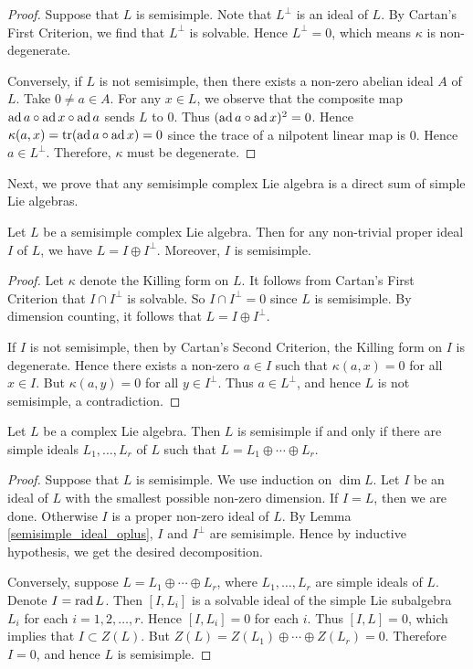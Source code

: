 \begin{proof}
    Suppose that $L$ is semisimple. Note that $L^\perp$ is an ideal of $L$. By Cartan's First Criterion, we find that $L^\perp$ is solvable. Hence $L^\perp=0$, which means $\kappa$ is non-degenerate.

    Conversely, if $L$ is not semisimple, then there exists a non-zero abelian ideal $A$ of $L$. Take $0\neq a\in A$. For any $x\in L$, we observe that the composite map $\operatorname{ad} a\circ \operatorname{ad} x \circ \operatorname{ad} a$ sends $L$ to 0. Thus $(\operatorname{ad} a \circ \operatorname{ad} x)^2=0$. Hence $\kappa(a,x)=\operatorname{tr}(\operatorname{ad} a \circ \operatorname{ad} x)=0$ since the trace of a nilpotent linear map is 0. Hence $a\in L^\perp$. Therefore, $\kappa$ must be degenerate.
\end{proof}

Next, we prove that any semisimple complex Lie algebra is a direct sum of simple Lie algebras. 

\begin{lem}\label{semisimple_ideal_oplus}
    Let $L$ be a semisimple complex Lie algebra. Then for any non-trivial proper ideal $I$ of $L$, we have $L=I\oplus I^\perp$. Moreover, $I$ is semisimple.
\end{lem}

\begin{proof}
    Let $\kappa$ denote the Killing form on $L$. It follows from Cartan's First Criterion that $I\cap I^\perp$ is solvable. So $I\cap I^\perp=0$ since $L$ is semisimple. By dimension counting, it follows that $L=I\oplus I^\perp$.

    If $I$ is not semisimple, then by Cartan's Second Criterion, the Killing form on $I$ is degenerate. Hence there exists a non-zero $a\in I$ such that $\kappa(a,x)=0$ for all $x\in I$. But $\kappa(a,y)=0$ for all $y\in I^\perp$. Thus $a\in L^\perp$, and hence $L$ is not semisimple, a contradiction.
\end{proof}

\begin{thm}
    Let $L$ be a complex Lie algebra. Then $L$ is semisimple if and only if there are simple ideals $L_1,\ldots,L_r$ of $L$ such that $L=L_1\oplus\cdots\oplus L_r$.
\end{thm}

\begin{proof}
    Suppose that $L$ is semisimple. We use induction on $\dim L$. Let $I$ be an ideal of $L$ with the smallest possible non-zero dimension. If $I=L$, then we are done. Otherwise $I$ is a proper non-zero ideal of $L$. By Lemma \ref{semisimple_ideal_oplus}, $I$ and $I^\perp$ are semisimple. Hence by inductive hypothesis, we get the desired decomposition.

    Conversely, suppose $L=L_1\oplus\cdots\oplus L_r$, where $L_1,\ldots,L_r$ are simple ideals of $L$. Denote $I=\operatorname{rad} L$. Then $[I,L_i]$ is a solvable ideal of the simple Lie subalgebra $L_i$ for each $i=1,2,\ldots,r$. Hence $[I,L_i]=0$ for each $i$. Thus $[I,L]=0$, which implies that $I\subset Z(L)$. But $Z(L)=Z(L_1)\oplus\cdots\oplus Z(L_r)=0$. Therefore $I=0$, and hence $L$ is semisimple.
\end{proof}

